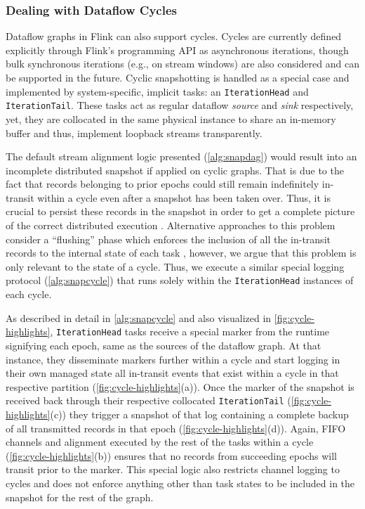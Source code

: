 \subsubsection{Dealing with Dataflow Cycles}

Dataflow graphs in Flink can also support cycles. Cycles are currently defined explicitly through Flink's programming API as asynchronous iterations, though bulk synchronous iterations (e.g., on stream windows) are also considered and can be supported in the future. Cyclic snapshotting is handled as a special case and implemented by system-specific, implicit tasks: an \texttt{IterationHead} and \texttt{IterationTail}. These tasks act as regular dataflow \emph{source} and \emph{sink} respectively, yet, they are collocated in the same physical instance to share an in-memory buffer and thus, implement loopback streams transparently.

The default stream alignment logic presented (\autoref{alg:snapdag}) would result into an incomplete distributed snapshot if applied on cyclic graphs. That is due to the fact that records belonging to prior epochs could still remain indefinitely in-transit within a cycle even after a snapshot has been taken over. Thus, it is crucial to persist these records in the snapshot in order to get a complete picture of the correct distributed execution \cite{chandy1985distributed,elnozahy2002survey}. Alternative approaches to this problem consider a ``flushing'' phase which enforces the inclusion of all the in-transit records to the internal state of each task \cite{jacques2016consistent}, however, we argue that this problem is only relevant to the state of a cycle. Thus, we execute a similar special logging protocol (\autoref{alg:snapcycle}) that runs solely within the \texttt{IterationHead} instances of each cycle.


As described in detail in \autoref{alg:snapcycle} and also visualized in \autoref{fig:cycle-highlights}, \texttt{IterationHead} tasks receive a special marker from the runtime signifying each epoch, same as the sources of the dataflow graph. At that instance, they disseminate markers further within a cycle and start logging in their own managed state all in-transit events that exist within a cycle in that respective partition (\autoref{fig:cycle-highlights}(a)). Once the marker of the snapshot is received back through their respective collocated \texttt{IterationTail} (\autoref{fig:cycle-highlights}(c)) they trigger a snapshot of that log containing a complete backup of all transmitted records in that epoch (\autoref{fig:cycle-highlights}(d)). Again, FIFO channels and alignment executed by the rest of the tasks within a cycle (\autoref{fig:cycle-highlights}(b)) ensures that no records from succeeding epochs will transit prior to the marker. This special logic also restricts channel logging to cycles and does not enforce anything other than task states to be included in the snapshot for the rest of the  graph.

